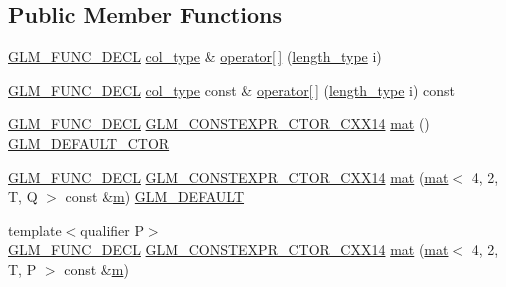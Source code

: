 \subsection*{Public Member Functions}
\begin{DoxyCompactItemize}
\item 
\mbox{\hyperlink{setup_8hpp_ab2d052de21a70539923e9bcbf6e83a51}{G\+L\+M\+\_\+\+F\+U\+N\+C\+\_\+\+D\+E\+CL}} \mbox{\hyperlink{structglm_1_1mat_3_014_00_012_00_01_t_00_01_q_01_4_a60138ab077eb3bef96e654e672af5059}{col\+\_\+type}} \& \mbox{\hyperlink{structglm_1_1mat_3_014_00_012_00_01_t_00_01_q_01_4_ac3817abff98f5328dd58c18536a6a368}{operator\mbox{[}$\,$\mbox{]}}} (\mbox{\hyperlink{structglm_1_1mat_3_014_00_012_00_01_t_00_01_q_01_4_a4b192a2630331f70ca61657d9783026e}{length\+\_\+type}} i)
\item 
\mbox{\hyperlink{setup_8hpp_ab2d052de21a70539923e9bcbf6e83a51}{G\+L\+M\+\_\+\+F\+U\+N\+C\+\_\+\+D\+E\+CL}} \mbox{\hyperlink{structglm_1_1mat_3_014_00_012_00_01_t_00_01_q_01_4_a60138ab077eb3bef96e654e672af5059}{col\+\_\+type}} const  \& \mbox{\hyperlink{structglm_1_1mat_3_014_00_012_00_01_t_00_01_q_01_4_a93bfd9601db1127f3204daa428f627e6}{operator\mbox{[}$\,$\mbox{]}}} (\mbox{\hyperlink{structglm_1_1mat_3_014_00_012_00_01_t_00_01_q_01_4_a4b192a2630331f70ca61657d9783026e}{length\+\_\+type}} i) const
\item 
\mbox{\hyperlink{setup_8hpp_ab2d052de21a70539923e9bcbf6e83a51}{G\+L\+M\+\_\+\+F\+U\+N\+C\+\_\+\+D\+E\+CL}} \mbox{\hyperlink{setup_8hpp_a0900f9145e68bf6061b6f5e7be3fa751}{G\+L\+M\+\_\+\+C\+O\+N\+S\+T\+E\+X\+P\+R\+\_\+\+C\+T\+O\+R\+\_\+\+C\+X\+X14}} \mbox{\hyperlink{structglm_1_1mat_3_014_00_012_00_01_t_00_01_q_01_4_ad00ae33ce233ac098c9d6ff11fe709a7}{mat}} () \mbox{\hyperlink{setup_8hpp_afb97a4e995bc004c0cbbfa22125b80ba}{G\+L\+M\+\_\+\+D\+E\+F\+A\+U\+L\+T\+\_\+\+C\+T\+OR}}
\item 
\mbox{\hyperlink{setup_8hpp_ab2d052de21a70539923e9bcbf6e83a51}{G\+L\+M\+\_\+\+F\+U\+N\+C\+\_\+\+D\+E\+CL}} \mbox{\hyperlink{setup_8hpp_a0900f9145e68bf6061b6f5e7be3fa751}{G\+L\+M\+\_\+\+C\+O\+N\+S\+T\+E\+X\+P\+R\+\_\+\+C\+T\+O\+R\+\_\+\+C\+X\+X14}} \mbox{\hyperlink{structglm_1_1mat_3_014_00_012_00_01_t_00_01_q_01_4_a0713be6991a8f52680ba77634bc88c5b}{mat}} (\mbox{\hyperlink{structglm_1_1mat}{mat}}$<$ 4, 2, T, Q $>$ const \&\mbox{\hyperlink{_s_d_l__opengl__glext_8h_af593500c283bf1a787a6f947f503a5c2}{m}}) \mbox{\hyperlink{setup_8hpp_aefce7051c376a64ba89fa93a9f63bc2c}{G\+L\+M\+\_\+\+D\+E\+F\+A\+U\+LT}}
\item 
{\footnotesize template$<$qualifier P$>$ }\\\mbox{\hyperlink{setup_8hpp_ab2d052de21a70539923e9bcbf6e83a51}{G\+L\+M\+\_\+\+F\+U\+N\+C\+\_\+\+D\+E\+CL}} \mbox{\hyperlink{setup_8hpp_a0900f9145e68bf6061b6f5e7be3fa751}{G\+L\+M\+\_\+\+C\+O\+N\+S\+T\+E\+X\+P\+R\+\_\+\+C\+T\+O\+R\+\_\+\+C\+X\+X14}} \mbox{\hyperlink{structglm_1_1mat_3_014_00_012_00_01_t_00_01_q_01_4_ad435b5f1f4b1647655ec65a9a8517e20}{mat}} (\mbox{\hyperlink{structglm_1_1mat}{mat}}$<$ 4, 2, T, P $>$ const \&\mbox{\hyperlink{_s_d_l__opengl__glext_8h_af593500c283bf1a787a6f947f503a5c2}{m}})

\end{DoxyCompactItemize}
